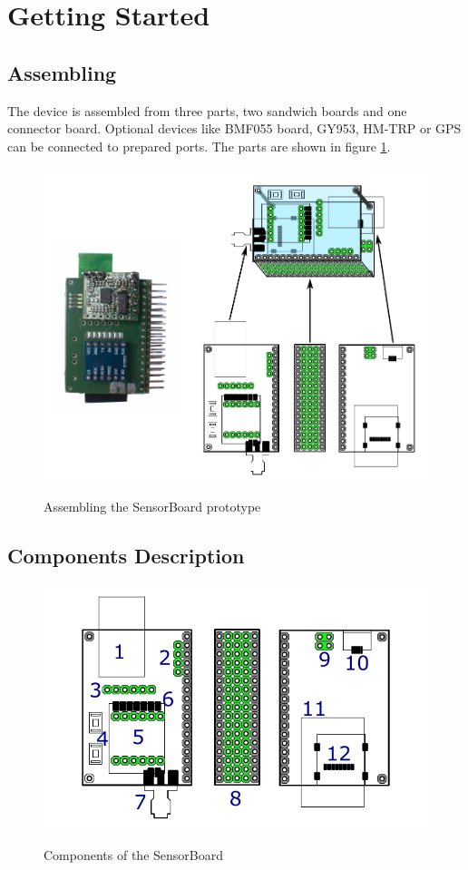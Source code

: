 \section{Getting Started}

\subsection{Assembling}
The device is assembled from three parts, two sandwich boards and one connector board. Optional devices like BMF055 board, GY953, HM-TRP or GPS can be connected to prepared ports. The parts are shown in figure \ref{HWassembling}.

\begin{figure}[H]
	\centering
	\includegraphics[scale=1]{img/assemblingHW.pdf}
	\label{HWassembling}
	\caption{Assembling the SensorBoard prototype}
\end{figure}

\subsection{Components Description}

\begin{figure}[H]
	\centering
	\includegraphics[scale=1]{img/componentsDescription.pdf}
	\label{HWcomponents}
	\caption{Components of the SensorBoard}
\end{figure}

